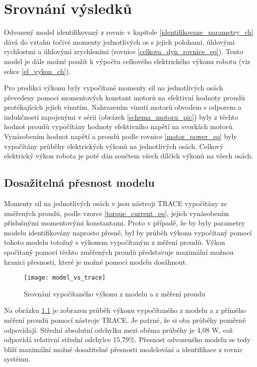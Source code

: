 \chapter{Srovnání výsledků}

Odvozený model identifikovaný z rovnic v kapitole \ref{identifikovane_parametry_ch} dává do vztahu točivé momenty jednotlivých os s jejich polohami, úhlovými rychlostmi a úhlovými zrychleními (rovnice \eqref{celkova_dyn_rovnice_eq}). Tento model je dále možné použít k výpočtu celkového elektrického výkonu robotu (viz sekce \ref{el_vykon_ch}).

Pro predikci výkonu byly vypočítané momenty sil na jednotlivých osách převedeny pomocí momentových konstant motorů na efektivní hodnoty proudů protékajících jejich vinutím. Nahrazením vinutí motorů obvodem s odporem a indukčností zapojenými v sérii (obrázek \ref{schema_motoru_pic}) byly z těchto hodnot proudů vypočítány hodnoty efektivního napětí na svorkách motorů. Vynásobením hodnot napětí a proudů podle rovnice \eqref{motor_power_eq} byly vypočítány průběhy elektrických výkonů na jednotlivých osách. Celkový elektrický výkon robota je poté dán součtem všech dílčích výkonů na všech osách. 

\section{Dosažitelná přesnost modelu}
\label{dosaz_presnost_sec}
Momenty sil na jednotlivých osách v jsou nástroji TRACE vypočítány ze změřených proudů, podle vzorce \eqref{torque_current_eq}, jejich vynásobením příslušnými momentovými konstantami. Proto v případě, že by byly parametry modelu identifikovány naprosto přesně, byl by průběh výkonu vypočítaný pomocí tohoto modelu totožný s výkonem vypočítaným z měření proudů. Výkon spočítaný pomocí těchto změřených proudů představuje maximální možnou hranici přesnosti, které je možné pomocí modelu dosáhnout. 

\begin{figure}[h!]
\texttt{[image: model\_vs\_trace]}
\caption{Srovnání vypočítaného výkonu z modelu a z měření proudu}
\label{model_vs_trace_pic}
\end{figure}

Na obrázku \ref{model_vs_trace_pic} je zobrazen průběh výkonu vypočítaného z modelu a z přímého měření proudů pomocí nástroje TRACE. Je patrné, že si oba průběhy poměrně odpovídají. Střední absolutní odchylka mezi oběma průběhy je 4,08 W, což odpovídá relativní střední odchylce 15,79\%. Přesnost odvozeného modelu se tedy blíží maximální možné dosažitelné přesnosti modelování a identifikace z rovnic systému.

